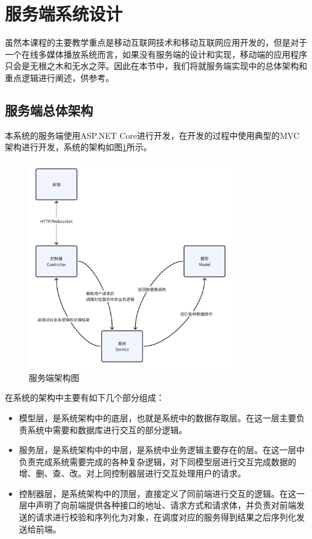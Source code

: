 \documentclass[main.tex]{subfiles}
\begin{document}
\section{服务端系统设计}

虽然本课程的主要教学重点是移动互联网技术和移动互联网应用开发的，但是对于一个在线多媒体播放系统而言，如果没有服务端的设计和实现，移动端的应用程序只会是无根之木和无水之萍。因此在本节中，我们将就服务端实现中的总体架构和重点逻辑进行阐述，供参考。

\subsection{服务端总体架构}

本系统的服务端使用ASP.NET Core进行开发，在开发的过程中使用典型的MVC架构进行开发，系统的架构如图\ref{fig:server-architecture}所示。

\begin{figure}[htbp]
    \centering
    \includegraphics[width=0.8\textwidth]{assets/server-architecture.png}
    \caption{服务端架构图}
    \label{fig:server-architecture}
\end{figure}

在系统的架构中主要有如下几个部分组成：
\begin{itemize}
    \item 模型层，是系统架构中的底层，也就是系统中的数据存取层。在这一层主要负责系统中需要和数据库进行交互的部分逻辑。
    \item 服务层，是系统架构中的中层，是系统中业务逻辑主要存在的层。在这一层中负责完成系统需要完成的各种复杂逻辑，对下同模型层进行交互完成数据的增、删、查、改。对上同控制器层进行交互处理用户的请求。
    \item 控制器层，是系统架构中的顶层，直接定义了同前端进行交互的逻辑。在这一层中声明了向前端提供各种接口的地址、请求方式和请求体，并负责对前端发送的请求进行校验和序列化为对象，在调度对应的服务得到结果之后序列化发送给前端。
\end{itemize}
\end{document}
